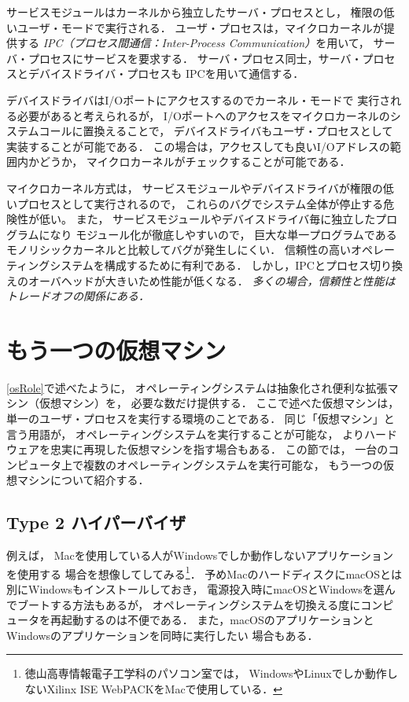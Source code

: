 サービスモジュールはカーネルから独立したサーバ・プロセスとし，
権限の低いユーザ・モードで実行される．
ユーザ・プロセスは，マイクロカーネルが提供する
\emph{IPC（プロセス間通信：Inter-Process Communication）}を用いて，
サーバ・プロセスにサービスを要求する．
サーバ・プロセス同士，サーバ・プロセスとデバイスドライバ・プロセスも
IPCを用いて通信する．

デバイスドライバはI/Oポートにアクセスするのでカーネル・モードで
実行される必要があると考えられるが，
I/Oポートへのアクセスをマイクロカーネルのシステムコールに置換えることで，
デバイスドライバもユーザ・プロセスとして実装することが可能である．
この場合は，アクセスしても良いI/Oアドレスの範囲内かどうか，
マイクロカーネルがチェックすることが可能である．

マイクロカーネル方式は，
サービスモジュールやデバイスドライバが権限の低いプロセスとして実行されるので，
これらのバグでシステム全体が停止する危険性が低い。
また，
サービスモジュールやデバイスドライバ毎に独立したプログラムになり
モジュール化が徹底しやすいので，
巨大な単一プログラムであるモノリシックカーネルと比較してバグが発生しにくい．
信頼性の高いオペレーティングシステムを構成するために有利である．
しかし，IPCとプロセス切り換えのオーバヘッドが大きいため性能が低くなる．
\emph{多くの場合，信頼性と性能はトレードオフの関係にある．}

\section{もう一つの仮想マシン}
\ref{osRole}で述べたように，
オペレーティングシステムは抽象化され便利な拡張マシン（仮想マシン）を，
必要な数だけ提供する．
ここで述べた仮想マシンは，単一のユーザ・プロセスを実行する環境のことである．
同じ「仮想マシン」と言う用語が，
オペレーティングシステムを実行することが可能な，
よりハードウェアを忠実に再現した仮想マシンを指す場合もある．
この節では，
一台のコンピュータ上で複数のオペレーティングシステムを実行可能な，
もう一つの仮想マシンについて紹介する．

\subsection{Type 2 ハイパーバイザ}
例えば，
Macを使用している人がWindowsでしか動作しないアプリケーションを使用する
場合を想像してしてみる\footnote{
  徳山高専情報電子工学科のパソコン室では，
  WindowsやLinuxでしか動作しないXilinx ISE WebPACKをMacで使用している．}．
予めMacのハードディスクにmacOSとは別にWindowsもインストールしておき，
電源投入時にmacOSとWindowsを選んでブートする方法もあるが，
オペレーティングシステムを切換える度にコンピュータを再起動するのは不便である．
また，macOSのアプリケーションとWindowsのアプリケーションを同時に実行したい
場合もある．

